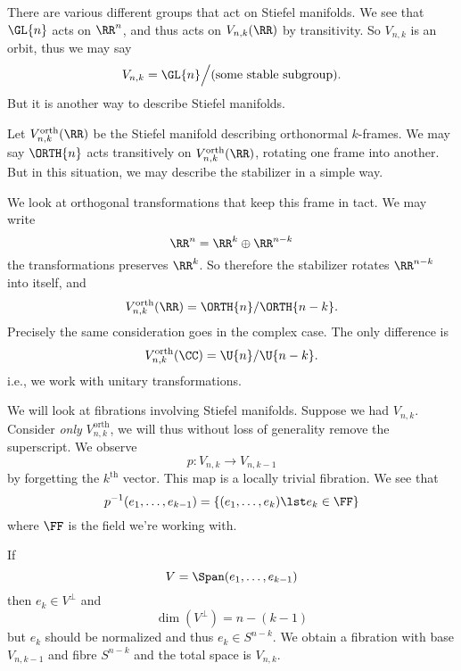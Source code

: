 There are various different groups that act on Stiefel
manifolds. We see that $\GL{n}$ acts on $\RR^{n}$, and thus acts
on $V_{n,k}(\RR)$ by transitivity. So $V_{n,k}$ is an orbit, thus
we may say 
\begin{equation}
V_{n,k}=\GL{n}\Big/(\text{some stable subgroup}).
\end{equation}
But it is another way to describe Stiefel manifolds.

Let $V_{n,k}^{\mathrm{orth}}(\RR)$ be the Stiefel manifold
describing orthonormal $k$-frames. We may say $\ORTH{n}$ acts
transitively on $V_{n,k}^{\mathrm{orth}}(\RR)$, rotating one
frame into another. But in this situation, we may describe the
stabilizer in a simple way.

We look at orthogonal transformations that keep this frame in
tact. We may write
\begin{equation}
\RR^{n}=\RR^{k}\oplus\RR^{n-k}
\end{equation}
the transformations preserves $\RR^{k}$. So therefore the
stabilizer rotates $\RR^{n-k}$ into itself, and
\begin{equation}
V^{\mathrm{orth}}_{n,k}(\RR)=\ORTH{n}/\ORTH{n-k}.
\end{equation}
Precisely the same consideration goes in the complex case. The
only difference is 
\begin{equation}
V^{\mathrm{orth}}_{n,k}(\CC)=\U{n}/\U{n-k}.
\end{equation}
i.e., we work with unitary transformations.

We will look at fibrations involving Stiefel manifolds. Suppose
we had $V_{n,k}$. Consider \emph{only} $V_{n,k}^{\mathrm{orth}}$,
we will thus without loss of generality remove the
superscript. We observe
\begin{equation}
p\colon V_{n,k}\to V_{n,k-1}
\end{equation}
by forgetting the $k^{\mathrm{th}}$ vector. This map is a locally
trivial fibration. We see that
\begin{equation}
p^{-1}(e_{1},\dots,e_{k-1})=\{(e_{1},\dots,e_{k})\lst
e_{k}\in\FF\}
\end{equation}
where $\FF$ is the field we're working with. 


If
\begin{equation}
V=\Span(e_{1},\dots,e_{k-1})
\end{equation}
then $e_{k}\in V^{\bot}$ and
\begin{equation}
\dim(V^{\bot})=n-(k-1)
\end{equation}
but $e_{k}$ should be normalized and thus $e_{k}\in S^{n-k}$. We
obtain a fibration with base $V_{n,k-1}$ and fibre $S^{n-k}$ and
the total space is $V_{n,k}$.

